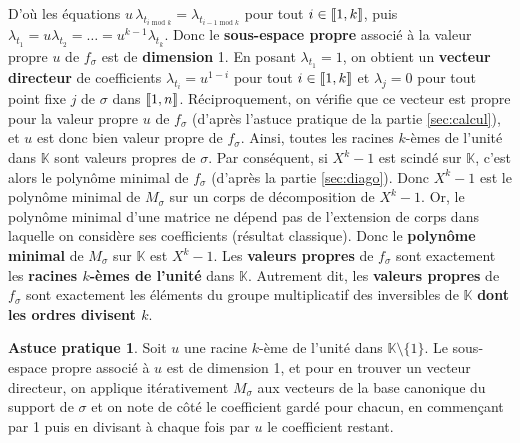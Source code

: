 \documentclass[10pt,a4paper,french,landscape]{article}
\DeclarePairedDelimiter\bracketlong{\llbracket}{\rrbracket}
\newcommand{\br}[1]{\bracketlong*{#1}}
\theoremstyle{definition}
\newtheorem*{as}{Astuce pratique}
\theoremstyle{remark}
\newcommand{\KK}{\mathbb K}
\newcommand{\1}{\mathbbm{1}}
\begin{document}
\begin{multicols*}{2}
D'où les équations
$u\,\lambda_{t_{i\text{ mod }k}}=\lambda_{t_{i-1\text{ mod }k}}$ pour tout $i\in\br{1,k}$, puis
${\lambda_{t_1}=u\lambda_{t_{2}}=\ldots=u^{k-1}\lambda_{t_k}}$. Donc le \textbf{sous-espace propre} associé à la valeur propre $u$ de $f_\sigma$ est de \textbf{dimension} 1.
En posant $\lambda_{t_1}=1$, on obtient un \textbf{vecteur directeur} de coefficients $\lambda_{t_{i}}=u^{1-i}$ pour tout $i\in\br{1,k}$ et $\lambda_j=0$ pour tout point fixe $j$ de $\sigma$ dans $\br{1,n}$. Réciproquement, on vérifie que ce vecteur est propre pour la valeur propre $u$ de $f_\sigma$ (d'après l'astuce pratique de la partie \ref{sec:calcul}), et $u$ est donc bien valeur propre de $f_\sigma$. Ainsi, toutes les racines $k$-èmes de l'unité dans $\KK$ sont valeurs propres de $\sigma$. Par conséquent, si $X^k-1$ est scindé sur $\KK$, c'est alors le polynôme minimal de $f_\sigma$ (d'après la partie \ref{sec:diago}). Donc $X^k-1$ est le polynôme minimal de $M_\sigma$ sur un corps de décomposition de $X^k-1$. Or, le polynôme minimal d'une matrice ne dépend pas de l'extension de corps dans laquelle on considère ses coefficients (résultat classique). Donc le \textbf{polynôme minimal} de $M_\sigma$ sur $\KK$ est $X^k-1$. Les \textbf{valeurs propres} de $f_\sigma$ sont exactement les \textbf{racines $k$-èmes de l'unité} dans $\KK$. Autrement dit, les \textbf{valeurs propres} de $f_\sigma$ sont exactement les éléments du groupe multiplicatif des inversibles de $\KK$ \textbf{dont les ordres divisent $k$}.
\medskip


\begin{as}
Soit $u$ une racine $k$-ème de l'unité dans $\KK\setminus\{1\}$. Le sous-espace propre associé à $u$ est de dimension 1, et pour en trouver un vecteur directeur, on applique itérativement $M_\sigma$ aux vecteurs de la base canonique du support de $\sigma$ et on note de côté le coefficient gardé pour chacun, en commençant par 1 puis en divisant à chaque fois par $u$ le coefficient restant.
\end{as}


\end{multicols*}
\end{document}
